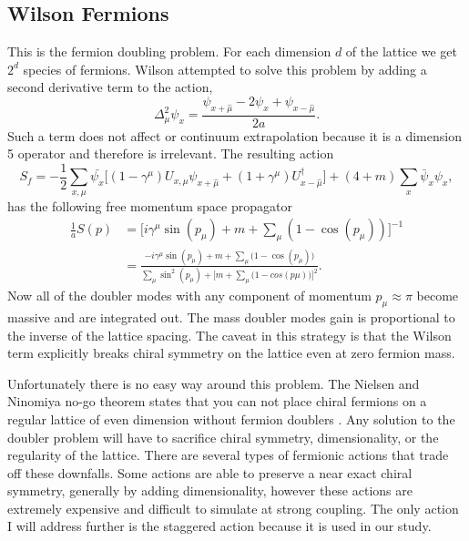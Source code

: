 \subsection{Wilson Fermions}
This is the fermion doubling problem.
For each dimension $d$ of the lattice we get $2^d$ species of fermions.
Wilson attempted to solve this problem by adding a second derivative term to the action,
\begin{equation}
  \Delta_\mu^2\psi_x=\frac{\psi_{x+\hat{\mu}}-2\psi_x+\psi_{x-\hat{\mu}}}{2a}.
\end{equation}
Such a term does not affect or continuum extrapolation because it is a dimension 5 operator and therefore is irrelevant.
The resulting action
\begin{equation}
  S_f=-\frac{1}{2}\sum_{x,\mu}\bar{\psi_x}\Big[(1-\gamma^\mu)U_{x,\mu}\psi_{x+\hat{\mu}}+(1+\gamma^\mu)U^\dagger_{x-\hat{\mu}}\Big]+(4+m)\sum_x\bar{\psi}_x\psi_x,
\end{equation}
has the following free momentum space propagator
\begin{equation}
  \begin{aligned}
    \frac{1}{a}S(p)&=\Big[i\gamma^\mu\sin(p_\mu)+m+\sum_\mu(1-\cos(p_\mu))\Big]^{-1}  \\
                   &=\frac{-i\gamma^\mu\sin(p_\mu)+m+\sum_\mu\big(1-\cos(p_\mu)\big)}{\sum_\mu\sin^2(p_\mu)+\Big[m+\sum_\mu\big(1-cos(p\mu)\big)\Big]^2}.
  \end{aligned}
\end{equation}
Now all of the doubler modes with any component of momentum $p_\mu\approx\pi$ become massive and are integrated out.
The mass doubler modes gain is proportional to the inverse of the lattice spacing.
The caveat in this strategy is that the Wilson term explicitly breaks chiral symmetry on the lattice even at zero fermion mass.

Unfortunately there is no easy way around this problem.
The Nielsen and Ninomiya no-go theorem states that you can not place chiral fermions on a regular lattice of even dimension without fermion doublers \cite{Nielsen198120,Nielsen1981173,Nielsen1981219,kaplan:fermions}.
Any solution to the doubler problem will have to sacrifice chiral symmetry, dimensionality, or the regularity of the lattice.
There are several types of fermionic actions that trade off these downfalls.
Some actions are able to preserve a near exact chiral symmetry, generally by adding dimensionality, however these actions are extremely expensive and difficult to simulate at strong coupling.
The only action I will address further is the staggered action because it is used in our study.

